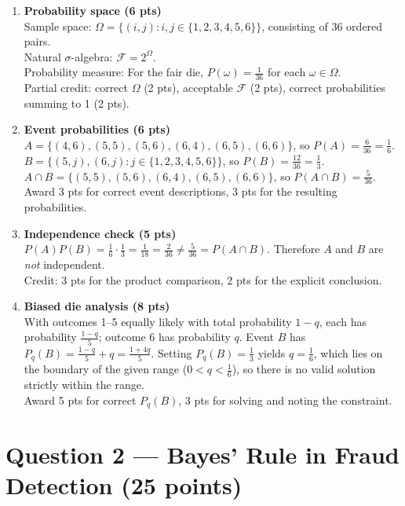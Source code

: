 \documentclass[11pt]{article}
\begin{document}
\begin{enumerate}
  \item \textbf{Probability space (6 pts)}\\
  Sample space: $\Omega = \{(i,j): i,j\in\{1,2,3,4,5,6\}\}$, consisting of 36 ordered pairs.\\
  Natural $\sigma$-algebra: $\mathcal{F} = 2^{\Omega}$.\\
  Probability measure: For the fair die, $P(\omega) = \tfrac{1}{36}$ for each $\omega\in\Omega$.\\
  Partial credit: correct $\Omega$ (2 pts), acceptable $\mathcal{F}$ (2 pts), correct probabilities summing to 1 (2 pts).

  \item \textbf{Event probabilities (6 pts)}\\
  $A=\{(4,6),(5,5),(5,6),(6,4),(6,5),(6,6)\}$, so $P(A)=\tfrac{6}{36}=\tfrac{1}{6}$.\\
  $B=\{(5,j),(6,j): j\in\{1,2,3,4,5,6\}\}$, so $P(B)=\tfrac{12}{36}=\tfrac{1}{3}$.\\
  $A\cap B=\{(5,5),(5,6),(6,4),(6,5),(6,6)\}$, so $P(A\cap B)=\tfrac{5}{36}$.\\
  Award 3 pts for correct event descriptions, 3 pts for the resulting probabilities.

  \item \textbf{Independence check (5 pts)}\\
  $P(A)P(B)=\tfrac{1}{6}\cdot\tfrac{1}{3}=\tfrac{1}{18}=\tfrac{2}{36}\neq\tfrac{5}{36}=P(A\cap B)$. Therefore $A$ and $B$ are \emph{not} independent.\\
  Credit: 3 pts for the product comparison, 2 pts for the explicit conclusion.

  \item \textbf{Biased die analysis (8 pts)}\\
  With outcomes 1--5 equally likely with total probability $1-q$, each has probability $\tfrac{1-q}{5}$; outcome 6 has probability $q$. Event $B$ has
  $P_q(B)=\tfrac{1-q}{5}+q=\tfrac{1+4q}{5}$. Setting $P_q(B)=\tfrac{1}{3}$ yields $q=\tfrac{1}{6}$, which lies on the boundary of the given range ($0<q<\tfrac{1}{6}$), so there is no valid solution strictly within the range.\\
  Award 5 pts for correct $P_q(B)$, 3 pts for solving and noting the constraint.
\end{enumerate}

\section*{Question 2 — Bayes' Rule in Fraud Detection (25 points)}
\end{document}
